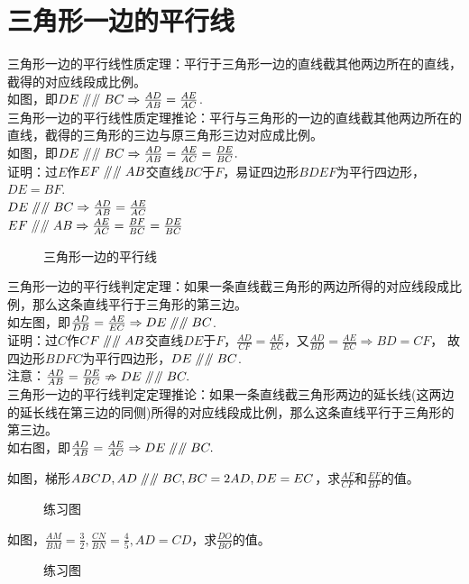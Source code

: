 \section{三角形一边的平行线}
\begin{theorem}
    三角形一边的平行线性质定理：平行于三角形一边的直线截其他两边所在的直线，截得的对应线段成比例。\\
    如图，即$DE \mathrel{/\mkern-5mu/} \mathrel{/\mkern-5mu/} BC \Rightarrow \frac{AD}{AB}=\frac{AE}{AC}$. \\
    三角形一边的平行线性质定理推论：平行与三角形的一边的直线截其他两边所在的直线，截得的三角形的三边与原三角形三边对应成比例。\\
    如图，即$DE\mathrel{/\mkern-5mu/}\mathrel{/\mkern-5mu/} BC \Rightarrow \frac{AD}{AB}=\frac{AE}{AC}=\frac{DE}{BC}.$ \\
    证明：过$E$作$EF\mathrel{/\mkern-5mu/}\mathrel{/\mkern-5mu/} AB$交直线$BC$于$F$，易证四边形$BDEF$为平行四边形，$DE=BF$.\\
    $DE \mathrel{/\mkern-5mu/} \mathrel{/\mkern-5mu/} BC \Rightarrow \frac{AD}{AB}=\frac{AE}{AC}$ \\
    $EF \mathrel{/\mkern-5mu/} \mathrel{/\mkern-5mu/} AB \Rightarrow \frac{AE}{AC}=\frac{BF}{BC}=\frac{DE}{BC}$
\end{theorem}
\begin{figure}[H]
    \centering
    \resizebox{6cm}{!}{}
    \caption{三角形一边的平行线}
\end{figure}
\begin{theorem}
    三角形一边的平行线判定定理：如果一条直线截三角形的两边所得的对应线段成比例，那么这条直线平行于三角形的第三边。\\
    如左图，即$\frac{AD}{DB}=\frac{AE}{EC}\Rightarrow DE \mathrel{/\mkern-5mu/} \mathrel{/\mkern-5mu/} BC$. \\
    证明：过$C$作$CF \mathrel{/\mkern-5mu/} \mathrel{/\mkern-5mu/} AB$交直线$DE$于$F$，$\frac{AD}{CF}=\frac{AE}{EC}$，又$\frac{AD}{BD}=\frac{AE}{EC}\Rightarrow BD=CF$，
    故四边形$BDFC$为平行四边形，$DE\mathrel{/\mkern-5mu/} \mathrel{/\mkern-5mu/} BC$. \\
    注意：$\frac{AD}{AB}=\frac{DE}{BC} \nRightarrow DE\mathrel{/\mkern-5mu/} \mathrel{/\mkern-5mu/} BC.$ \\
    三角形一边的平行线判定定理推论：如果一条直线截三角形两边的延长线(这两边的延长线在第三边的同侧)所得的对应线段成比例，那么这条直线平行于三角形的第三边。\\
    如右图，即$\frac{AD}{AB}=\frac{AE}{AC}\Rightarrow DE \mathrel{/\mkern-5mu/} \mathrel{/\mkern-5mu/} BC.$
\end{theorem}
\begin{problem}
如图，梯形$ABCD,AD\mathrel{/\mkern-5mu/} \mathrel{/\mkern-5mu/} BC,BC=2AD,DE=EC$，求$\frac{AF}{CF}$和$\frac{EF}{BF}$的值。
\end{problem}
\begin{figure}[H]
    \centering
    \resizebox{4cm}{!}{}
    \caption{练习图}
\end{figure}
\begin{problem}
如图，$\frac{AM}{BM}=\frac{3}{2},\frac{CN}{BN}=\frac{4}{5},AD=CD$，求$\frac{DO}{BO}$的值。\\
\end{problem}
\begin{figure}[H]
    \centering
    \resizebox{4cm}{!}{}
    \caption{练习图}
\end{figure}
\clearpage
